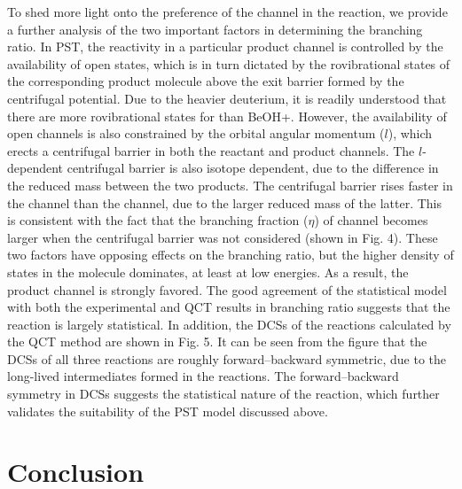 To shed more light onto the preference of the  channel in the  reaction, we provide a further analysis of the two important factors in determining the branching ratio. In PST, the reactivity in a particular product channel is controlled by the availability of open states, which is in turn dictated by the rovibrational states of the corresponding product molecule above the exit barrier formed by the centrifugal potential. Due to the heavier deuterium, it is readily understood that there are more rovibrational states for  than BeOH+. However, the availability of open channels is also constrained by the orbital angular momentum ($l$), which erects a centrifugal barrier in both the reactant and product channels. The $l$-dependent centrifugal barrier is also isotope dependent, due to the difference in the reduced mass between the two products. The centrifugal barrier rises faster in the  channel than the  channel, due to the larger reduced mass of the latter. This is consistent with the fact that the branching fraction ($\eta$) of  channel becomes larger when the centrifugal barrier was not considered (shown in Fig. 4). These two factors have opposing effects on the branching ratio, but the higher density of states in the  molecule dominates, at least at low energies. As a result, the  product channel is strongly favored. The good agreement of the statistical model with both the experimental and QCT results in branching ratio suggests that the reaction is largely statistical. In addition, the DCSs of the  reactions calculated by the QCT method are shown in Fig. 5. It can be seen from the figure that the DCSs of all three reactions are roughly forward–backward symmetric, due to the long-lived intermediates formed in the reactions. The forward–backward symmetry in DCSs suggests the statistical nature of the reaction, which further validates the suitability of the PST model discussed above.

\section{Conclusion}

